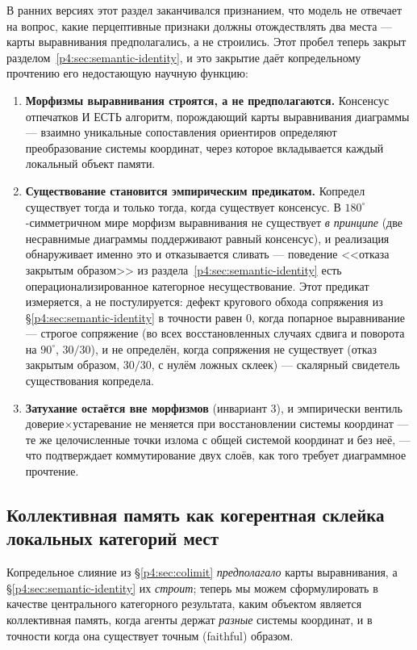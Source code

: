 \documentclass{article}
\begin{document}
В ранних версиях этот раздел заканчивался признанием, что модель не
отвечает на вопрос, какие перцептивные признаки должны отождествлять
два места --- карты выравнивания предполагались, а не строились. Этот
пробел теперь закрыт разделом~\ref{p4:sec:semantic-identity}, и это
закрытие даёт копредельному прочтению его недостающую научную функцию:
\begin{enumerate}[leftmargin=20pt,itemsep=2pt,topsep=2pt]
\item \textbf{Морфизмы выравнивания строятся, а не предполагаются.}
  Консенсус отпечатков И ЕСТЬ алгоритм, порождающий карты выравнивания
  диаграммы --- взаимно уникальные сопоставления ориентиров определяют
  преобразование системы координат, через которое вкладывается каждый
  локальный объект памяти.
\item \textbf{Существование становится эмпирическим предикатом.}
  Копредел существует тогда и только тогда, когда существует
  консенсус. В $180^\circ$-симметричном мире морфизм выравнивания не
  существует \emph{в принципе} (две несравнимые диаграммы
  поддерживают равный консенсус), и реализация обнаруживает именно
  это и отказывается сливать --- поведение <<отказа закрытым образом>>
  из раздела~\ref{p4:sec:semantic-identity} есть операционализированное
  категорное несуществование. Этот предикат измеряется, а не
  постулируется: дефект кругового обхода сопряжения из
  \S\ref{p4:sec:semantic-identity} в точности равен $0$, когда попарное
  выравнивание --- строгое сопряжение (во всех восстановленных
  случаях сдвига и поворота на $90^\circ$, $30/30$), и не определён,
  когда сопряжения не существует (отказ закрытым образом, $30/30$, с
  нулём ложных склеек) --- скалярный свидетель существования
  копредела.
\item \textbf{Затухание остаётся вне морфизмов} (инвариант 3), и
  эмпирически вентиль доверие$\times$устаревание не меняется при
  восстановлении системы координат --- те же целочисленные точки
  излома с общей системой координат и без неё, --- что подтверждает
  коммутирование двух слоёв, как того требует диаграммное прочтение.
\end{enumerate}

\subsection{Коллективная память как когерентная склейка локальных категорий мест}
\label{p4:sec:gluing}

Копредельное слияние из \S\ref{p4:sec:colimit} \emph{предполагало} карты
выравнивания, а \S\ref{p4:sec:semantic-identity} их \emph{строит}; теперь мы можем
сформулировать в качестве центрального категорного результата, каким объектом
является коллективная память, когда агенты держат \emph{разные} системы
координат, и в точности когда она существует точным (faithful) образом.
\end{document}
